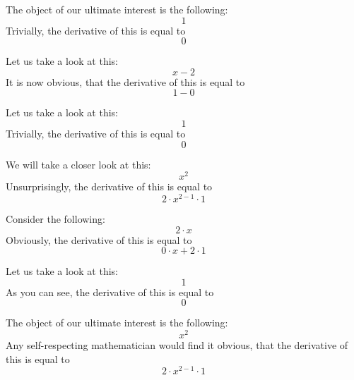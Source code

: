 \documentclass{article}
\begin{document}
The object of our ultimate interest is the following:
\begin{equation}
1 
\end{equation}
Trivially, the derivative of this is equal to
\begin{equation}
0 
\end{equation}

Let us take a look at this:
\begin{equation}
x - 2 
\end{equation}
It is now obvious, that the derivative of this is equal to
\begin{equation}
1 - 0 
\end{equation}

Let us take a look at this:
\begin{equation}
1 
\end{equation}
Trivially, the derivative of this is equal to
\begin{equation}
0 
\end{equation}

We will take a closer look at this:
\begin{equation}
x ^{2 } 
\end{equation}
Unsurprisingly, the derivative of this is equal to
\begin{equation}
2 \cdot x ^{2 - 1 } \cdot 1 
\end{equation}

Consider the following:
\begin{equation}
2 \cdot x 
\end{equation}
Obviously, the derivative of this is equal to
\begin{equation}
0 \cdot x + 2 \cdot 1 
\end{equation}

Let us take a look at this:
\begin{equation}
1 
\end{equation}
As you can see, the derivative of this is equal to
\begin{equation}
0 
\end{equation}

The object of our ultimate interest is the following:
\begin{equation}
x ^{2 } 
\end{equation}
Any self-respecting mathematician would find it obvious, that the derivative of this is equal to
\begin{equation}
2 \cdot x ^{2 - 1 } \cdot 1 
\end{equation}
\end{document}
